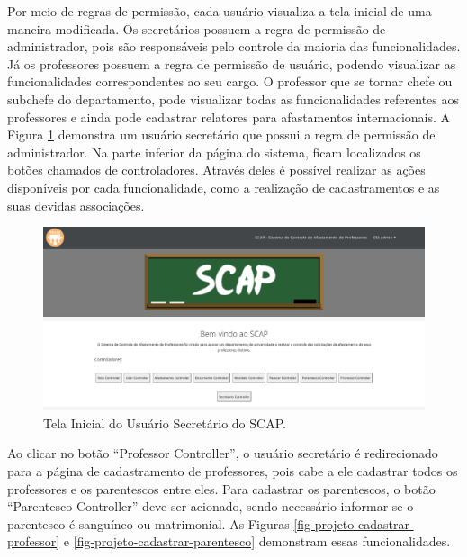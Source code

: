Por meio de regras de permissão, cada usuário visualiza a tela inicial de uma maneira modificada. Os secretários possuem a regra de permissão de administrador, pois são responsáveis pelo controle da maioria das funcionalidades. Já os professores possuem a regra de permissão de usuário, podendo visualizar as funcionalidades correspondentes ao seu cargo. O professor que se tornar chefe ou subchefe do departamento, pode visualizar todas as funcionalidades referentes aos professores e ainda pode cadastrar relatores para afastamentos internacionais. A Figura \ref{fig-projeto-usuario-secretario} demonstra um usuário secretário que possui a regra de permissão de administrador. Na parte inferior da página do sistema, ficam localizados os botões chamados de controladores. Através deles é possível realizar as ações disponíveis por cada funcionalidade, como a realização de cadastramentos e as suas devidas associações. 

\begin{figure}[h]
	\centering
	\includegraphics[scale=0.33]{figuras/fig-projeto-usuario-secretario} 
	\caption{Tela Inicial do Usuário Secretário do SCAP.}
	\label{fig-projeto-usuario-secretario}
\end{figure}

Ao clicar no botão ``Professor Controller'', o usuário secretário é redirecionado para a página de cadastramento de professores, pois cabe a ele cadastrar todos os professores e os parentescos entre eles. Para cadastrar os parentescos, o botão ``Parentesco Controller'' deve ser acionado, sendo necessário informar se o parentesco é sanguíneo ou matrimonial. As Figuras \ref{fig-projeto-cadastrar-professor} e \ref{fig-projeto-cadastrar-parentesco} demonstram essas funcionalidades.

